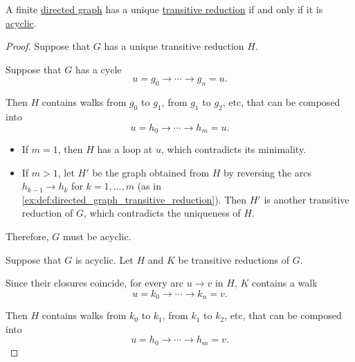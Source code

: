 \begin{proposition}\label{thm:graph_transitive_reduction_uniqueness}
  A finite \hyperref[def:directed_graph]{directed graph} has a unique \hyperref[def:directed_graph_transitive_closure]{transitive reduction} if and only if it is \hyperref[def:acyclic_graph]{acyclic}.
\end{proposition}
\begin{proof}
  \SufficiencySubProof Suppose that \( G \) has a unique transitive reduction \( H \).

  Suppose that \( G \) has a cycle
  \begin{equation*}
    u = g_0 \to \cdots \to g_n = u.
  \end{equation*}

  Then \( H \) contains walks from \( g_0 \) to \( g_1 \), from \( g_1 \) to \( g_2 \), etc, that can be composed into
  \begin{equation*}
    u = h_0 \to \cdots \to h_m = u.
  \end{equation*}

  \begin{itemize}
    \item If \( m = 1 \), then \( H \) has a loop at \( u \), which contradicts its minimality.
    \item If \( m > 1 \), let \( H' \) be the graph obtained from \( H \) by reversing the arcs \( h_{k-1} \to h_k \) for \( k = 1, \ldots, m \) (as in \cref{ex:def:directed_graph_transitive_reduction}). Then \( H' \) is another transitive reduction of \( G \), which contradicts the uniqueness of \( H \).
  \end{itemize}

  Therefore, \( G \) must be acyclic.

  \NecessitySubProof Suppose that \( G \) is acyclic. Let \( H \) and \( K \) be transitive reductions of \( G \).

  Since their closures coincide, for every arc \( u \to v \) in \( H \), \( K \) contains a walk
  \begin{equation*}
    u = k_0 \to \cdots \to k_n = v.
  \end{equation*}

  Then \( H \) contains walks from \( k_0 \) to \( k_1 \), from \( k_1 \) to \( k_2 \), etc, that can be composed into
  \begin{equation}\label{eq:thm:graph_transitive_reduction_uniqueness/proof/necessity/extended}
    u = h_0 \to \cdots \to h_m = v.
  \end{equation}


\end{proof}
